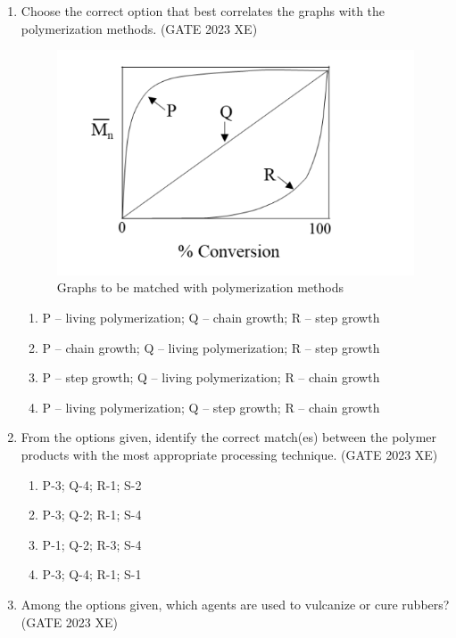 \documentclass[journal,12pt,onecolumn]{IEEEtran}
\begin{document}
\begin{enumerate}
\newpage

\item Choose the correct option that best correlates the graphs with the polymerization methods.
\hfill{(GATE 2023 XE)}

\begin{figure}[htbp]
\centering
\includegraphics[width=0.4\columnwidth]{figs/E/fig2.png}
\caption{Graphs to be matched with polymerization methods}
\label{fig:figs/E/fig2.png}
\end{figure}

\begin{multicols}{2}
\begin{enumerate}
\item P – living polymerization; Q – chain growth; R – step growth
\item P – chain growth; Q – living polymerization; R – step growth
\item P – step growth; Q – living polymerization; R – chain growth
\item P – living polymerization; Q – step growth; R – chain growth
\end{enumerate}
\end{multicols}

\item From the options given, identify the correct match(es) between the polymer products with the most appropriate processing technique.
\hfill{(GATE 2023 XE)}



\begin{multicols}{2}
\begin{enumerate}
\item P-3; Q-4; R-1; S-2
\item P-3; Q-2; R-1; S-4
\item P-1; Q-2; R-3; S-4
\item P-3; Q-4; R-1; S-1
\end{enumerate}
\end{multicols}

\item Among the options given, which agents are used to vulcanize or cure rubbers?
\hfill{(GATE 2023 XE)}


\end{enumerate}
\end{document}

